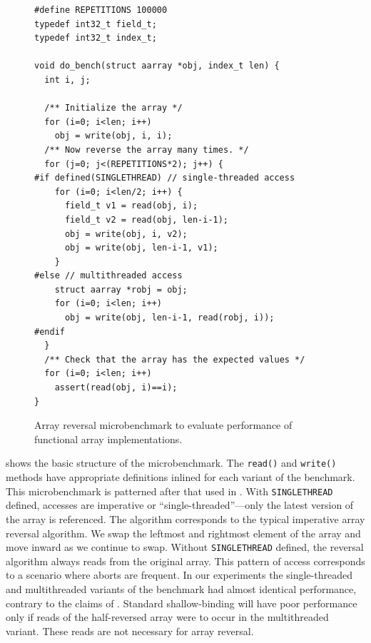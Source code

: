 \begin{figure}
\sis\fontsize{9}{10}\begin{verbatim}
#define REPETITIONS 100000
typedef int32_t field_t;
typedef int32_t index_t;

void do_bench(struct aarray *obj, index_t len) {
  int i, j;

  /** Initialize the array */
  for (i=0; i<len; i++)
    obj = write(obj, i, i);
  /** Now reverse the array many times. */
  for (j=0; j<(REPETITIONS*2); j++) {
#if defined(SINGLETHREAD) // single-threaded access
    for (i=0; i<len/2; i++) {
      field_t v1 = read(obj, i);
      field_t v2 = read(obj, len-i-1);
      obj = write(obj, i, v2);
      obj = write(obj, len-i-1, v1);
    }
#else // multithreaded access
    struct aarray *robj = obj;
    for (i=0; i<len; i++)
      obj = write(obj, len-i-1, read(robj, i));
#endif
  }
  /** Check that the array has the expected values */
  for (i=0; i<len; i++)
    assert(read(obj, i)==i);
}
\end{verbatim}
\caption{Array reversal microbenchmark to evaluate performance of
  functional array implementations.}
\label{fig:array-bench}
\end{figure}

 shows the basic structure of the microbenchmark.
The \texttt{read()} and \texttt{write()} methods
have appropriate definitions inlined for each variant of the
benchmark.  This microbenchmark is patterned after that used in
\cite[p.507]{ONeillBu97}.  With \texttt{SINGLETHREAD} defined,
accesses are imperative or ``single-threaded''---only the latest
version of the array is referenced.  The algorithm corresponds to the
typical imperative array reversal algorithm.  We swap the leftmost and
rightmost element of the array and move inward as we continue to swap.
Without \texttt{SINGLETHREAD} defined,
the reversal algorithm always reads from the original
array.  This pattern of access corresponds to a scenario where aborts
are frequent.
In our experiments the single-threaded and multithreaded variants of
the benchmark had almost identical performance, contrary to the claims
of \cite{ONeillBu97}.  Standard shallow-binding will have poor
performance only if reads of the half-reversed array were to occur in the
multithreaded variant.  These reads are not necessary for array reversal.


